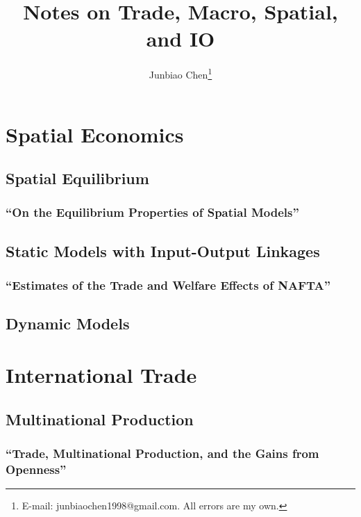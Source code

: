 \documentclass[11pt]{report}
\title{Notes on Trade, Macro, Spatial, and IO}
\author{
Junbiao Chen\thanks{E-mail: junbiaochen1998@gmail.com.
All errors are my own.}
}
\date{}
\theoremstyle{definition}
\numberwithin{equation}{section}
\numberwithin{figure}{section}
\numberwithin{table}{section}
\begin{document}
\maketitle

\renewcommand{\thechapter}{\Alph{chapter}}
\setcounter{tocdepth}{2}
\tableofcontents
\etocsettocstyle{}{} %

\chapter{Spatial Economics}
\section{Spatial Equilibrium}
\subsection{``On the Equilibrium Properties of Spatial Models'' \\ \citep{Allen:2024}}  

\clearpage
\section{Static Models with Input-Output Linkages}
\subsection{``Estimates of the Trade and Welfare Effects of NAFTA'' \\ \citep{Caliendo:2015}} 

\clearpage
\section{Dynamic Models}

\chapter{International Trade}
\section{Multinational Production}


\subsection{``Trade, Multinational Production, and the Gains from Openness'' \\ \citep{Ramondo:2013}} 

\end{document}
